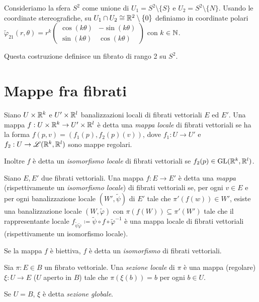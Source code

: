 \begin{example}
	Consideriamo la sfera $S^2$ come unione di $U_1 = S^2\setminus \{S\}$ e $U_2 = S^2\setminus \{N\}$. Usando le coordinate stereografiche, su $U_1\cap U_2\cong \mathbb R^2\setminus\{0\}$ definiamo in coordinate polari $\tilde\varphi_{21}(r,\theta) = r^k \left(\begin{matrix} \cos(k\theta)& -\sin(k\theta)\\ \sin(k\theta)& \cos(k\theta) \end{matrix}\right)$ con $k\in\mathbb N$.
	
	Questa costruzione definisce un fibrato di rango 2 su $S^2$.
\end{example}


\section{Mappe fra fibrati}

\begin{definition}
	Siano $U\times\mathbb R^k$ e $U'\times\mathbb R^l$ banalizzazioni locali di fibrati vettoriali $E$ ed $E'$. Una mappa $f:U\times\mathbb R^k\to U'\times\mathbb R^l$ è detta una \emph{mappa locale} di fibrati vettoriali se ha la forma $f(p,v) = (f_1(p), f_2(p)(v) )$, dove $f_1:U\to U'$ e $f_2:U \to \mathscr L(\mathbb R^k,\mathbb R^l)$ sono mappe regolari.
	
	Inoltre $f$ è detta un \emph{isomorfismo locale} di fibrati vettoriali se $f_2(p)\in \mathrm{GL}(\mathbb R^k,\mathbb R^l)$.
\end{definition}


\begin{definition}
	Siano $E,E'$ due fibrati vettoriali. Una mappa $f:E \to E'$ è detta una \emph{mappa} (rispettivamente un \emph{isomorfismo locale}) di fibrati vettoriali se, per ogni $v \in E$ e per ogni banalizzazione locale $(W',\tilde\psi)$ di $E'$ tale che $\pi'(f(w))\in W'$, esiste una banalizzazione locale $(W,\tilde\varphi)$ con $\pi(f(W))\subseteq \pi'(W')$ tale che il rappresentante locale $f_{\tilde\psi\tilde\varphi}\coloneqq \tilde\psi\circ f \circ \tilde\varphi^{-1}$ è una mappa locale di fibrati vettoriali (rispettivamente un isomorfismo locale).
	
	Se la mappa $f$ è biettiva, $f$ è detta un \emph{isomorfismo} di fibrati vettoriali.
\end{definition}


\begin{definition}
	Sia $\pi:E\in B$ un fibrato vettoriale. Una \emph{sezione locale} di $\pi$ è una mappa (regolare) $\xi:U \to E$ ($U$ aperto in $B$) tale che $\pi(\xi(b)) = b$ per ogni $b\in U$.
	
	Se $U = B$, $\xi$ è detta \emph{sezione globale}.
\end{definition}

